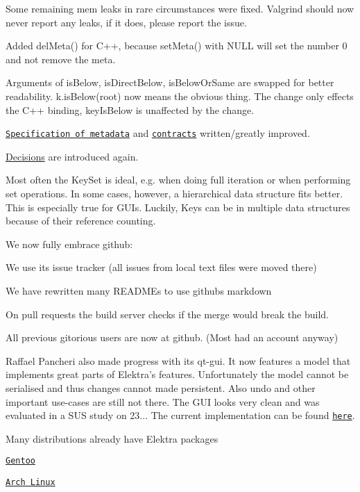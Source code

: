 Some remaining mem leaks in rare circumstances were fixed. Valgrind should now never report any leaks, if it does, please report the issue.

Added del\+Meta() for C++, because set\+Meta() with N\+U\+LL will set the number 0 and not remove the meta.

Arguments of is\+Below, is\+Direct\+Below, is\+Below\+Or\+Same are swapped for better readability. k.\+is\+Below(root) now means the obvious thing. The change only effects the C++ binding, key\+Is\+Below is unaffected by the change.

\href{/home/jenkins/workspace/libelektra-release/doc/METADATA.ini}{\tt Specification of metadata} and \href{/home/jenkins/workspace/libelektra-release/doc/CONTRACT.ini}{\tt contracts} written/greatly improved.

\hyperlink{doc_decisions_README_md}{Decisions} are introduced again.

Most often the Key\+Set is ideal, e.\+g. when doing full iteration or when performing set operations. In some cases, however, a hierarchical data structure fits better. This is especially true for G\+U\+Is. Luckily, Keys can be in multiple data structures because of their reference counting.

We now fully embrace github\+:


\begin{DoxyItemize}
\item We use its issue tracker (all issues from local text files were moved there)
\item We have rewritten many R\+E\+A\+D\+M\+Es to use githubs markdown
\item On pull requests the build server checks if the merge would break the build.
\item All previous gitorious users are now at github. (Most had an account anyway)
\end{DoxyItemize}

Raffael Pancheri also made progress with its qt-\/gui. It now features a model that implements great parts of Elektra’s features. Unfortunately the model cannot be serialised and thus changes cannot made persistent. Also undo and other important use-\/cases are still not there. The G\+UI looks very clean and was evaluated in a S\+US study on 23... The current implementation can be found \href{https://github.com/0003088/qt-gui}{\tt here}.

Many distributions already have Elektra packages


\begin{DoxyItemize}
\item \href{http://packages.gentoo.org/package/app-admin/elektra}{\tt Gentoo}
\item \href{https://aur.archlinux.org/packages/elektra/}{\tt Arch Linux}
\end{DoxyItemize}

